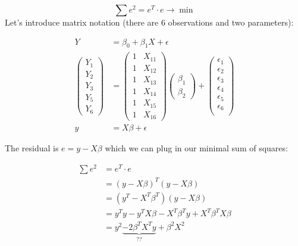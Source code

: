 \documentclass[
]{book}
\begin{document}
\[\sum e^2 = e^T \cdot e \rightarrow \min\]
Let's introduce matrix notation (there are 6 observations and two parameters):

\[ \begin{align}
Y &= \beta_0 + \beta_1 X + \epsilon \tag{X is a variable, Y is a variable} \\
\begin{pmatrix} Y_1 \\ Y_2 \\ Y_3 \\ Y_5 \\ Y_6 \end{pmatrix} &= \begin{pmatrix} 1 & X_{11} \\ 1 & X_{12} \\ 1 & X_{13} \\ 1 & X_{14} \\ 1 & X_{15} \\ 1 & X_{16}   \end{pmatrix} \begin{pmatrix} \beta_1 \\ \beta_2 \end{pmatrix} + \begin{pmatrix} \epsilon_1 \\ \epsilon_2 \\ \epsilon_3 \\ \epsilon_4 \\ \epsilon_5 \\ \epsilon_6 \\ \end{pmatrix} \\
y &= X \beta + \epsilon \tag{X is a matrix, y is a vector}
\end{align}\]

The residual is \(e = y - X \beta\) which we can plug in our minimal sum of squares:

\[\begin{align}
    \sum e^2 &= e^T \cdot e \tag{short RSS}\\
    &= (y - X \beta )^T (y - X \beta) \tag{$(A+B)^T = A^T + B^T$}\\
    &= (y^T - X^T \beta^T) (y - X \beta) \\
    &= y^T y - y^T X \beta - X^T \beta^T y + X^T \beta^T X \beta \\
    &= y^2 \underbrace{- 2 \beta^T X^T y}_{??} + \beta^2 X^2  \\
\end{align}\]
\end{document}
